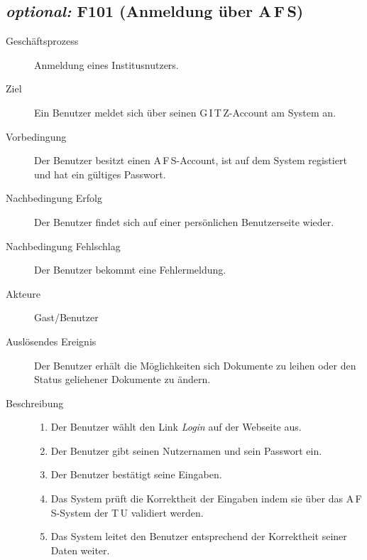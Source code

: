 \subsection{\emph{optional:} F101 (Anmeldung über A\,F\,S)}
\label{F:AnmeldungAFS}
\begin{description}
  \item[Geschäftsprozess]Anmeldung eines Institusnutzers.
  \item[Ziel]Ein Benutzer meldet sich über seinen G\,I\,T\,Z-Account am System an.
  \item[Vorbedingung]Der Benutzer besitzt einen A\,F\,S-Account, ist auf dem System registiert und hat ein gültiges Passwort.
  \item[Nachbedingung Erfolg]Der Benutzer findet sich auf einer persönlichen Benutzerseite wieder.
  \item[Nachbedingung Fehlschlag]Der Benutzer bekommt eine Fehlermeldung.
  \item[Akteure]Gast/Benutzer
  \item[Auslösendes Ereignis]Der Benutzer erhält die Möglichkeiten sich Dokumente zu leihen oder den Status geliehener Dokumente zu ändern.
  \item[Beschreibung]\hfill
    \begin{enumerate}
      \item Der Benutzer wählt den Link \emph{Login} auf der Webseite aus.
      \item Der Benutzer gibt seinen Nutzernamen und sein Passwort ein.
      \item Der Benutzer bestätigt seine Eingaben.
      \item Das System prüft die Korrektheit der Eingaben indem sie über das A\,F\,S-System der T\,U validiert werden.
      \item Das System leitet den Benutzer entsprechend der Korrektheit seiner Daten weiter.
    \end{enumerate}
\end{description}

